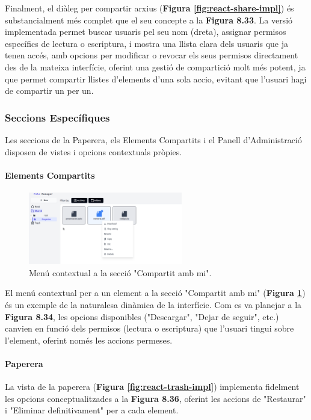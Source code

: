 Finalment, el diàleg per compartir arxius (\textbf{Figura \ref{fig:react-share-impl}}) és substancialment més complet que el seu concepte a la \textbf{Figura 8.33}. La versió implementada permet buscar usuaris pel seu nom (dreta), assignar permisos específics de lectura o escriptura, i mostra una llista clara dels usuaris que ja tenen accés, amb opcions per modificar o revocar els seus permisos directament des de la mateixa interfície, oferint una gestió de compartició molt més potent, ja que permet compartir llistes d'elements d'una sola accio, evitant que l'usuari hagi de compartir un per un.

\subsubsection{Seccions Específiques}
Les seccions de la Paperera, els Elements Compartits i el Panell d'Administració disposen de vistes i opcions contextuals pròpies.

\paragraph{Elements Compartits}
\begin{figure}[H]
    \centering
    \includegraphics[width=0.6\textwidth]{Figures/ui-web/shared_section_options.png}
    \caption{Menú contextual a la secció "Compartit amb mi".}
    \label{fig:react-shared-options-impl}
\end{figure}
El menú contextual per a un element a la secció "Compartit amb mi" (\textbf{Figura \ref{fig:react-shared-options-impl}}) és un exemple de la naturalesa dinàmica de la interfície. Com es va planejar a la \textbf{Figura 8.34}, les opcions disponibles ("Descargar", "Dejar de seguir", etc.) canvien en funció dels permisos (lectura o escriptura) que l'usuari tingui sobre l'element, oferint només les accions permeses.

\paragraph{Paperera}
La vista de la paperera (\textbf{Figura \ref{fig:react-trash-impl}}) implementa fidelment les opcions conceptualitzades a la \textbf{Figura 8.36}, oferint les accions de "Restaurar" i "Eliminar definitivament" per a cada element.

